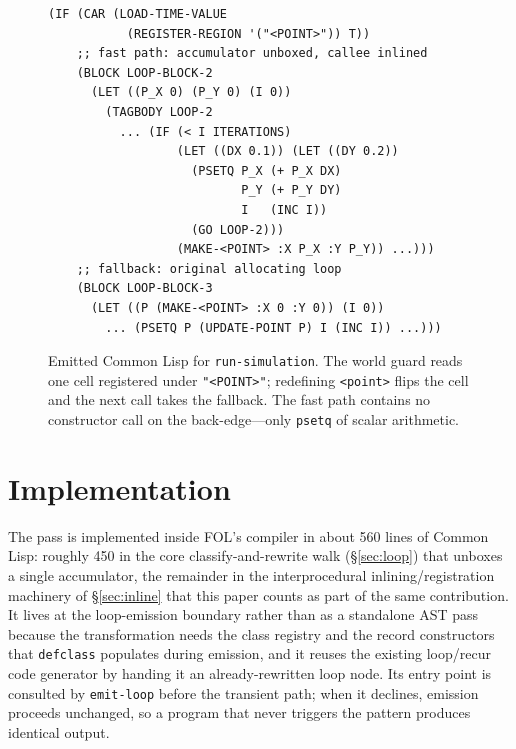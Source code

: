 \documentclass[sigplan,screen,review,anonymous]{acmart}
\begin{document}
\begin{figure}
\begin{lstlisting}
(IF (CAR (LOAD-TIME-VALUE
           (REGISTER-REGION '("<POINT>")) T))
    ;; fast path: accumulator unboxed, callee inlined
    (BLOCK LOOP-BLOCK-2
      (LET ((P_X 0) (P_Y 0) (I 0))
        (TAGBODY LOOP-2
          ... (IF (< I ITERATIONS)
                  (LET ((DX 0.1)) (LET ((DY 0.2))
                    (PSETQ P_X (+ P_X DX)
                           P_Y (+ P_Y DY)
                           I   (INC I))
                    (GO LOOP-2)))
                  (MAKE-<POINT> :X P_X :Y P_Y)) ...)))
    ;; fallback: original allocating loop
    (BLOCK LOOP-BLOCK-3
      (LET ((P (MAKE-<POINT> :X 0 :Y 0)) (I 0))
        ... (PSETQ P (UPDATE-POINT P) I (INC I)) ...)))
\end{lstlisting}
\caption{Emitted Common Lisp for \texttt{run-simulation}. The world guard reads
one cell registered under \texttt{"<POINT>"}; redefining \texttt{<point>} flips
the cell and the next call takes the fallback. The fast path contains no
constructor call on the back-edge---only \texttt{psetq} of scalar arithmetic.}
\label{fig:emitted}
\vspace{-\baselineskip}
\end{figure}

\section{Implementation}
\label{sec:impl}

The pass is implemented inside FOL's compiler in about 560 lines of Common Lisp:
roughly 450 in the core classify-and-rewrite walk (\S\ref{sec:loop}) that
unboxes a single accumulator, the remainder in the interprocedural
inlining/registration machinery of \S\ref{sec:inline} that this paper counts
as part of the same contribution.
It lives at the loop-emission boundary rather than as a standalone AST pass
because the transformation needs the class registry and the record
constructors that \texttt{defclass} populates during emission, and it reuses the
existing loop/recur code generator by handing it an already-rewritten loop node.
Its entry point is consulted by \texttt{emit-loop} before the transient path;
when it declines, emission proceeds unchanged, so a program that never
triggers the pattern produces identical output.
\end{document}
